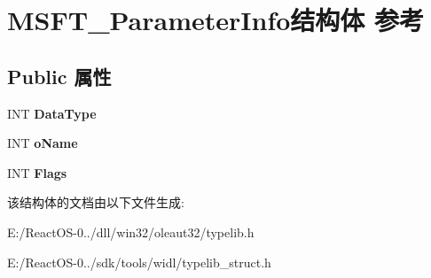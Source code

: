 \hypertarget{struct_m_s_f_t___parameter_info}{}\section{M\+S\+F\+T\+\_\+\+Parameter\+Info结构体 参考}
\label{struct_m_s_f_t___parameter_info}
\subsection*{Public 属性}
\begin{DoxyCompactItemize}
\item 
\mbox{\label{struct_m_s_f_t___parameter_info_a7cd373dd82da7e4e2440d40177252926}} 
I\+NT {\bfseries Data\+Type}
\item 
\mbox{\label{struct_m_s_f_t___parameter_info_ad32a7b898ee79931cdc6c2506c782418}} 
I\+NT {\bfseries o\+Name}
\item 
\mbox{\label{struct_m_s_f_t___parameter_info_aeda5a7491564e078edf5aad3235c7e94}} 
I\+NT {\bfseries Flags}
\end{DoxyCompactItemize}


该结构体的文档由以下文件生成\+:\begin{DoxyCompactItemize}
\item 
E\+:/\+React\+O\+S-\/0../dll/win32/oleaut32/typelib.\+h\item 
E\+:/\+React\+O\+S-\/0../sdk/tools/widl/typelib\+\_\+struct.\+h\end{DoxyCompactItemize}
